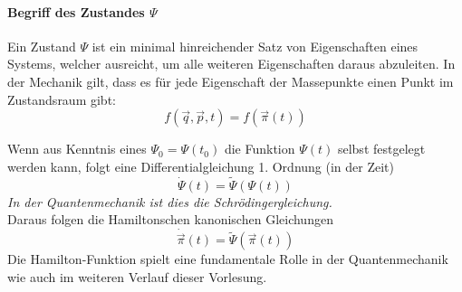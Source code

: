 \documentclass[oneside]{book}
\theoremstyle{definition}
\newcommand{\dotvec}[1]{\dot{\vec{#1}}}
\begin{document}
\paragraph{Begriff des Zustandes $\Psi$}
Ein Zustand $\Psi$ ist ein minimal hinreichender Satz von Eigenschaften eines Systems, welcher ausreicht, um alle weiteren Eigenschaften daraus abzuleiten. In der Mechanik gilt, dass es für jede Eigenschaft der Massepunkte einen Punkt im Zustandsraum gibt: 
$$f(\vec{q}, \vec{p}, t) = f(\vec{\pi}(t))$$


Wenn aus Kenntnis eines $\Psi_0 = \Psi(t_0)$ die Funktion $\Psi(t)$ selbst festgelegt werden kann, folgt eine Differentialgleichung 1. Ordnung (in der Zeit)
$$\dot{\Psi}(t) = \tilde{\Psi}(\Psi(t))$$
\textit{In der Quantenmechanik ist dies die Schrödingergleichung.}\\
Daraus folgen die Hamiltonschen kanonischen Gleichungen
$$\dotvec \pi (t) = \tilde{\Psi}(\vec{\pi}(t))$$
Die Hamilton-Funktion spielt eine fundamentale Rolle in der Quantenmechanik wie auch im weiteren Verlauf dieser Vorlesung.

\newcommand{\vpi}{\vec{\pi}}
\newcommand{\poisson}[1]{\{#1\}_{\vec{p}, \vec{q}}}
\end{document}
